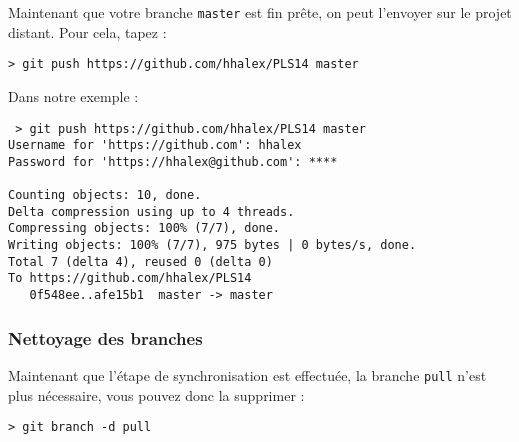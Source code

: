 \par Maintenant que votre branche \texttt{master} est fin prête, on peut l'envoyer sur le projet distant. Pour cela, tapez :

\begin{verbatim}
> git push https://github.com/hhalex/PLS14 master
\end{verbatim}

\par Dans notre exemple :
\begin{verbatim}
 > git push https://github.com/hhalex/PLS14 master
Username for 'https://github.com': hhalex
Password for 'https://hhalex@github.com': ****

Counting objects: 10, done.
Delta compression using up to 4 threads.
Compressing objects: 100% (7/7), done.
Writing objects: 100% (7/7), 975 bytes | 0 bytes/s, done.
Total 7 (delta 4), reused 0 (delta 0)
To https://github.com/hhalex/PLS14
   0f548ee..afe15b1  master -> master
\end{verbatim}

\subsubsection{Nettoyage des branches}
\label{sec:nett-des-branch}

\par Maintenant que l'étape de synchronisation est effectuée, la branche \texttt{pull} n'est plus nécessaire, vous pouvez donc la supprimer :
\begin{verbatim}
> git branch -d pull
\end{verbatim}

